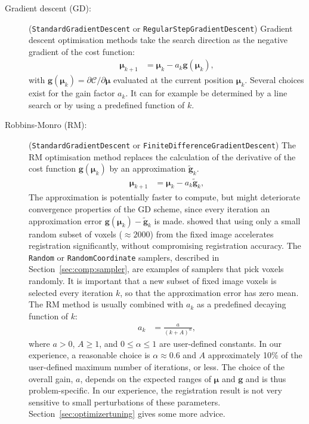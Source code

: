 \documentclass[]{report}
\newcommand{\vmu}{\bm{\mu}}
\begin{document}
\begin{description}
\item[Gradient descent (GD):] (\texttt{StandardGradientDescent}
or \texttt{RegularStepGradientDescent}) Gradient descent optimisation
methods take the search direction as the negative gradient of the
cost function:
\begin{align}
\vmu_{k+1} &= \vmu_k - a_k \bm{g}(\vmu_k),\label{eq:gd}
\end{align}
with $\bm{g}(\vmu_k) = \partial \mathcal{C} / \partial \vmu$
evaluated at the current position $\vmu_k$. Several choices exist for
the gain factor $a_k$. It can for example be determined by a line
search or by using a predefined function of $k$.

\item[Robbins-Monro (RM):]
(\texttt{StandardGradientDescent} or
\texttt{FiniteDifferenceGradientDescent}) The RM optimisation
method replaces the calculation of the derivative of the cost
function $\bm{g}(\vmu_k)$ by an approximation
$\widetilde{\bm{g}}_k$.
\begin{align}
\vmu_{k+1} &= \vmu_k - a_k \widetilde{\bm{g}}_k,\label{eq:RM}
\end{align}
The approximation is potentially faster to compute, but might
deteriorate convergence properties of the GD scheme, since every
iteration an approximation error $\bm{g}(\vmu_k) -
\widetilde{\bm{g}}_k$ is made. \citet{KleinEA07} showed that using
only a small random subset of voxels (\mbox{$\approx 2000$}) from
the fixed image accelerates registration significantly, without
compromising registration accuracy. The \texttt{Random} or
\texttt{RandomCoordinate} samplers, described in
Section~\ref{sec:comp:sampler}, are examples of samplers that pick
voxels randomly. It is important that a new subset of fixed image
voxels is selected every iteration $k$, so that the approximation
error has zero mean. The RM method is usually combined with $a_k$ as
a predefined decaying function of $k$:
\begin{align}
a_k &= \frac{a}{(k+A)^{\alpha}},\label{eq:gain}
\end{align}
where $a > 0$, $A \ge 1$, and $0 \le \alpha \le 1$ are
user-defined constants. In our experience, a reasonable choice is
$\alpha \approx 0.6$ and $A$ approximately 10\% of the
user-defined maximum number of iterations, or less. The choice of
the overall gain, $a$, depends on the expected ranges of $\vmu$
and $\bm{g}$ and is thus problem-specific. In our experience, the
registration result is not very sensitive to small perturbations
of these parameters. Section~\ref{sec:optimizertuning} gives some
more advice.
\end{description}
\end{document}
